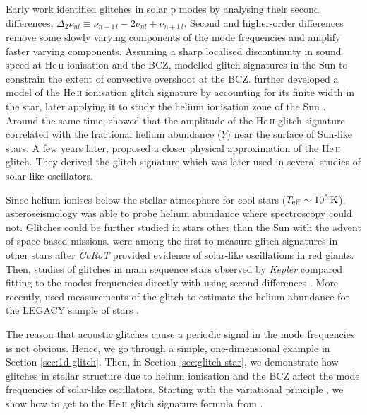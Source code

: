 Early work identified glitches in solar p modes by analysing their second differences, \(\Delta_2\nu_{nl} \equiv \nu_{n-1\,l} - 2\nu_{nl} + \nu_{n+1\,l}\). Second and higher-order differences remove some slowly varying components of the mode frequencies and amplify faster varying components. Assuming a sharp localised discontinuity in sound speed at He\,\textsc{ii} ionisation and the BCZ, \citet{Basu.Antia.ea1994,Basu1997} modelled glitch signatures in the Sun to constrain the extent of convective overshoot at the BCZ. \citet{Monteiro.Thompson1998} further developed a model of the He\,\textsc{ii} ionisation glitch signature by accounting for its finite width in the star, later applying it to study the helium ionisation zone of the Sun \citep{Monteiro.Thompson2005}. Around the same time, \citet{Basu.Mazumdar.ea2004} showed that the amplitude of the He\,\textsc{ii} glitch signature correlated with the fractional helium abundance (\(Y\)) near the surface of Sun-like stars. A few years later, \citet{Houdek.Gough2007} proposed a closer physical approximation of the He\,\textsc{ii} glitch. They derived the glitch signature which was later used in several studies of solar-like oscillators.

Since helium ionises below the stellar atmosphere for cool stars (\({T_\mathrm{eff}} \sim \SI{e5}{\kelvin}\)), asteroseismology was able to probe helium abundance where spectroscopy could not. Glitches could be further studied in stars other than the Sun with the advent of space-based missions. \citet{Miglio.Montalban.ea2010,Mazumdar.Michel.ea2012} were among the first to measure glitch signatures in other stars after \emph{CoRoT} provided evidence of solar-like oscillations in red giants. Then, studies of glitches in main sequence stars observed by \emph{Kepler} compared fitting to the modes frequencies directly with using second differences \citep{Mazumdar.Monteiro.ea2012,Mazumdar.Monteiro.ea2014,Verma.Raodeo.ea2017}. More recently, \citet{Verma.Raodeo.ea2019} used measurements of the glitch to estimate the helium abundance for the LEGACY sample of stars \citet{Lund.SilvaAguirre.ea2017}.

The reason that acoustic glitches cause a periodic signal in the mode frequencies is not obvious. Hence, we go through a simple, one-dimensional example in Section \ref{sec:1d-glitch}. Then, in Section \ref{sec:glitch-star}, we demonstrate how glitches in stellar structure due to helium ionisation and the BCZ affect the mode frequencies of solar-like oscillators. Starting with the variational principle \citep{Chandrasekhar1964}, we show how to get to the He\,\textsc{ii} glitch signature formula from \citet{Houdek.Gough2007}.

